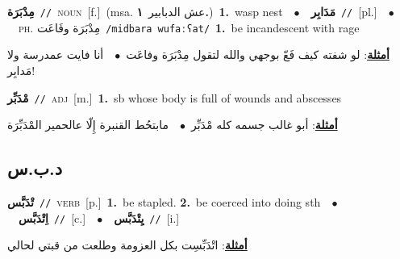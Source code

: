 \documentclass[10pt,a4paper,twoside]{article} %
\begin{document}
\begin{multicols}{2}
{\setlength\topsep{0pt}\textbf{\foreignlanguage{arabic}{مِدْبَرَة}}\ {\color{gray}\texttt{//}\color{black}}\ \textsc{noun}\ [f.]\ \color{gray}(msa. \foreignlanguage{arabic}{عش الدبابير}~\foreignlanguage{arabic}{\textbf{١.}})\color{black}\ \textbf{1.}~wasp nest\ \ $\bullet$\ \ \setlength\topsep{0pt}\textbf{\foreignlanguage{arabic}{مَدَابِر}}\ {\color{gray}\texttt{//}\color{black}}\ [pl.]\ \ $\bullet$\ \ \textsc{ph.} \color{gray} \foreignlanguage{arabic}{مِدْبَرَة وفَاعَت}\color{black}\ {\color{gray}\texttt{/{\sffamily midbara wufaːʕat}/}\color{black}}\ \textbf{1.}~be incandescent with rage\  \begin{flushright}\color{gray}\foreignlanguage{arabic}{\textbf{\underline{\foreignlanguage{arabic}{أمثلة}}}: لو شفته كيف فَعّ بوجهي والله لتقول مِدْبَرَة وفاعَت\ $\bullet$\ \  أنا فايت عمدرسة ولا مَدابِر!}\end{flushright}\color{black}} \vspace{2mm}

{\setlength\topsep{0pt}\textbf{\foreignlanguage{arabic}{مْدَبِّر}}\ {\color{gray}\texttt{//}\color{black}}\ \textsc{adj}\ [m.]\ \textbf{1.}~sb whose body is full of wounds and abscesses\  \begin{flushright}\color{gray}\foreignlanguage{arabic}{\textbf{\underline{\foreignlanguage{arabic}{أمثلة}}}: أبو غالب جسمه كله مْدَبِّر\ $\bullet$\ \  مابتحُط القنبرة إِلّا عالحمير المْدَبِّرَة}\end{flushright}\color{black}} \vspace{2mm}

\vspace{-3mm}
\subsection*{\color{blue}\foreignlanguage{arabic}{د.ب.س}\color{blue}{}} 

{\setlength\topsep{0pt}\textbf{\foreignlanguage{arabic}{تْدَبَّس}}\ {\color{gray}\texttt{//}\color{black}}\ \textsc{verb}\ [p.]\ \textbf{1.}~be stapled.  \textbf{2.}~be coerced into doing sth\ \ $\bullet$\ \ \setlength\topsep{0pt}\textbf{\foreignlanguage{arabic}{اِتْدَبَّس}}\ {\color{gray}\texttt{//}\color{black}}\ [c.]\ \ $\bullet$\ \ \setlength\topsep{0pt}\textbf{\foreignlanguage{arabic}{يِتْدَبَّس}}\ {\color{gray}\texttt{//}\color{black}}\ [i.]\  \begin{flushright}\color{gray}\foreignlanguage{arabic}{\textbf{\underline{\foreignlanguage{arabic}{أمثلة}}}: اتْدَبِّسِت بكل العزومة وطلعت من قبتي لحالي}\end{flushright}\color{black}} \vspace{2mm}


\end{multicols}
\end{document}
